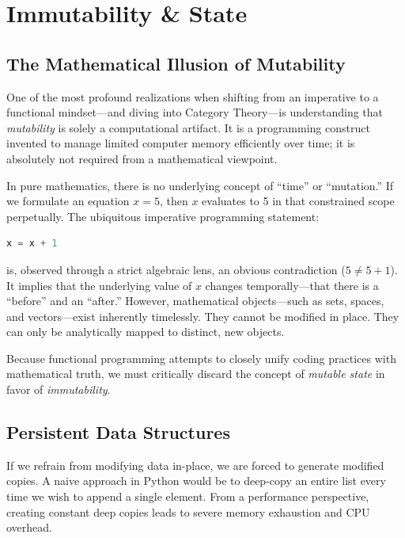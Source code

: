 \chapter{Immutability \& State}

\section{The Mathematical Illusion of Mutability}

One of the most profound realizations when shifting from an imperative to a functional mindset—and diving into Category Theory—is understanding that \textit{mutability} is solely a computational artifact. It is a programming construct invented to manage limited computer memory efficiently over time; it is absolutely not required from a mathematical viewpoint.

In pure mathematics, there is no underlying concept of ``time'' or ``mutation.'' If we formulate an equation $x = 5$, then $x$ evaluates to 5 in that constrained scope perpetually. The ubiquitous imperative programming statement:
\begin{lstlisting}[language=Python]
x = x + 1
\end{lstlisting}
is, observed through a strict algebraic lens, an obvious contradiction ($5 \neq 5 + 1$). It implies that the underlying value of $x$ changes temporally—that there is a ``before'' and an ``after.'' However, mathematical objects—such as sets, spaces, and vectors—exist inherently timelessly. They cannot be modified in place. They can only be analytically mapped to distinct, new objects. 

Because functional programming attempts to closely unify coding practices with mathematical truth, we must critically discard the concept of \textit{mutable state} in favor of \textit{immutability}. 



\section{Persistent Data Structures}

If we refrain from modifying data in-place, we are forced to generate modified copies. A naive approach in Python would be to deep-copy an entire list every time we wish to append a single element. From a performance perspective, creating constant deep copies leads to severe memory exhaustion and CPU overhead.

